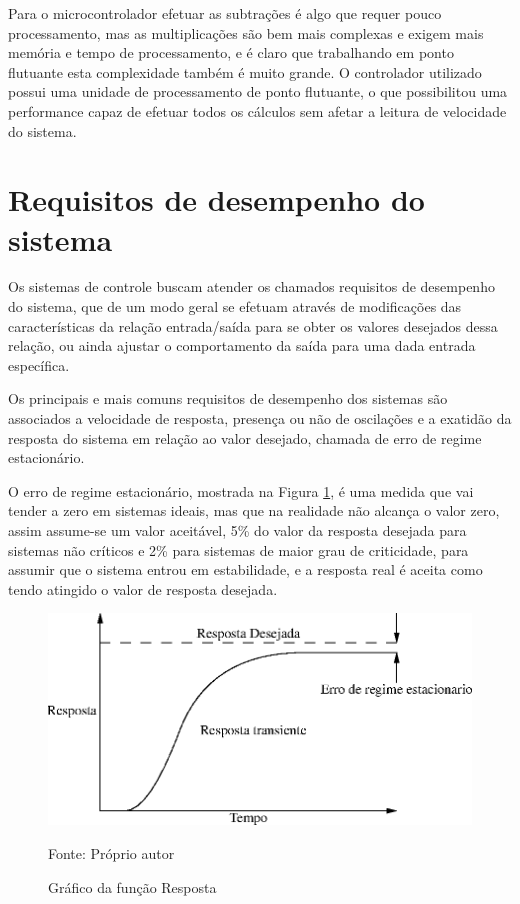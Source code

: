 Para o microcontrolador efetuar as subtrações é algo que requer pouco processamento, mas as multiplicações são bem mais complexas e exigem mais memória e tempo de processamento, e é claro que trabalhando em ponto flutuante esta complexidade também é muito grande. O controlador utilizado possui uma unidade de processamento de ponto flutuante, o que possibilitou uma performance capaz de efetuar todos os cálculos sem afetar a leitura de velocidade do sistema.


\section{Requisitos de desempenho do sistema}

Os sistemas de controle buscam atender os chamados requisitos de desempenho do sistema, que de um modo geral se efetuam através de modificações das características da relação entrada/saída para se obter os valores desejados dessa relação, ou ainda ajustar o comportamento da saída para uma dada entrada específica.

Os principais e mais comuns requisitos de desempenho dos sistemas são associados a velocidade de resposta, presença ou não de oscilações e a exatidão da resposta do sistema em relação ao valor desejado, chamada de erro de regime estacionário.

O erro de regime estacionário, mostrada na Figura \ref{fig:funcaoResposta}, é uma medida que vai tender a zero em sistemas ideais, mas que na realidade não alcança o valor zero, assim assume-se um valor aceitável, 5\% do valor da resposta desejada para sistemas não críticos e 2\% para sistemas de maior grau de criticidade, para assumir que o sistema entrou em estabilidade, e a resposta real é aceita como tendo atingido o valor de resposta desejada. 

\begin{figure}[!htb]
\centering
\caption{Gráfico da função Resposta}
\center\includegraphics[scale=1]{./imagens/C400grafico.eps}
\label{fig:funcaoResposta}

{\small Fonte: Próprio autor}
\end{figure}

